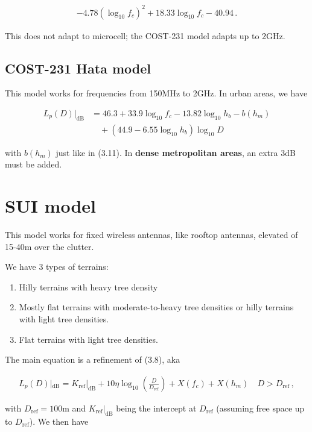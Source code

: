 \documentclass[a4paper, 12pt]{book}
\begin{document}
\begin{align}
-4.78(\log_{10} f_c)^2 + 18.33 \log_{10} f_c - 40.94 \,. \tag{3.13}
\end{align}

This does not adapt to microcell; the COST-231 model adapts up to 2GHz.

\subsection{COST-231 Hata model}

This model works for frequencies from 150MHz to 2GHz. In urban areas, we have

\begin{align}
L_p(D)|_{\text{dB}} &= 46.3 + 33.9 \log_{10} f_c - 13.82 \log_{10} h_b - b(h_m) \nonumber \\
&\quad + (44.9 - 6.55 \log_{10} h_b) \log_{10} D \tag{3.14}
\end{align}

with $b(h_m)$ just like in (3.11).
In \textbf{dense metropolitan areas}, an extra 3dB must be added.

\section{SUI model}

This model works for fixed wireless antennas, like rooftop antennas, elevated of 15-40m over the clutter.

We have 3 types of terrains:
\begin{enumerate}[label=\Alph*.]
    \item Hilly terrains with heavy tree density
    \item Mostly flat terrains with moderate-to-heavy tree densities or hilly terrains with light tree densities.
    \item Flat terrains with light tree densities.
\end{enumerate}

The main equation is a refinement of (3.8), aka

\begin{align}
L_p(D)|_{\text{dB}} = K_{\text{ref}}|_{\text{dB}} + 10\eta \log_{10} \left( \frac{D}{D_{\text{ref}}} \right) + X(f_c) + X(h_m) \quad D > D_{\text{ref}} \,,
\end{align}

with $D_{\text{ref}} = 100\text{m}$ and $K_{\text{ref}}|_{\text{dB}}$ being the intercept at $D_{\text{ref}}$ (assuming free space up to $D_{\text{ref}}$).
We then have
\end{document}

